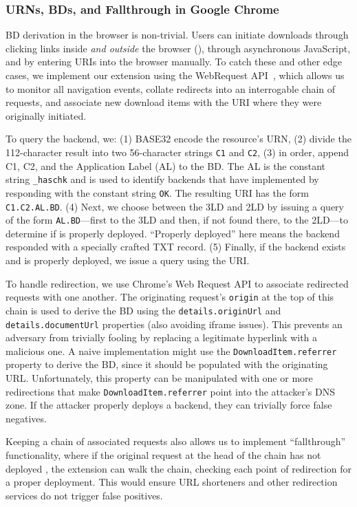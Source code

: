 \subsubsection{URNs, BDs, and Fallthrough in Google Chrome}

BD derivation in the browser is non-trivial. Users can initiate downloads
through clicking links inside \emph{and outside} the browser (), through asynchronous JavaScript, and by entering URIs into the
browser manually. To catch these and other edge cases, we implement our
extension using the WebRequest API~\cite{ExtensionAPI}, which allows us to
monitor all navigation events, collate redirects into an interrogable chain of
requests, and associate new download items with the URI where they were
originally initiated.

To query the backend, we: (1) BASE32 encode the resource's URN, (2) divide the
112-character result into two 56-character strings \texttt{C1} and \texttt{C2},
(3) in order, append C1, C2, and the Application Label (AL) to the BD. The AL is
the constant string \texttt{\_haschk} and is used to identify backends that have
implemented \SYSTEM{} by responding with the constant string \texttt{OK}. The
resulting URI has the form \texttt{C1.C2.AL.BD}. (4) Next, we choose between the
3LD and 2LD by issuing a query of the form \texttt{AL.BD}---first to the 3LD and
then, if not found there, to the 2LD---to determine if \SYSTEM{} is properly
deployed. ``Properly deployed'' here means the backend responded with a
specially crafted TXT record. (5) Finally, if the \SYSTEM{} backend exists and
is properly deployed, we issue a query using the URI.

To handle redirection, we use Chrome's Web Request API to associate redirected
requests with one another. The originating request's \texttt{origin} at the top
of this chain is used to derive the BD using the \texttt{details.originUrl} and
\texttt{details.documentUrl} properties (also avoiding iframe issues). This
prevents an adversary from trivially fooling \SYSTEM{} by replacing a legitimate
hyperlink with a malicious one. A naive implementation might use the
\texttt{DownloadItem.referrer} property to derive the BD, since it should be
populated with the originating URL. Unfortunately, this property can be
manipulated with one or more redirections that make
\texttt{DownloadItem.referrer} point into the attacker's DNS zone. If the
attacker properly deploys a \SYSTEM{} backend, they can trivially force false
negatives.

Keeping a chain of associated requests also allows us to implement
``fallthrough'' functionality, where if the original request at the head of the
chain has not deployed \SYSTEM{}, the extension can walk the chain, checking
each point of redirection for a proper \SYSTEM{} deployment. This would ensure
URL shorteners and other redirection services do not trigger false positives.
